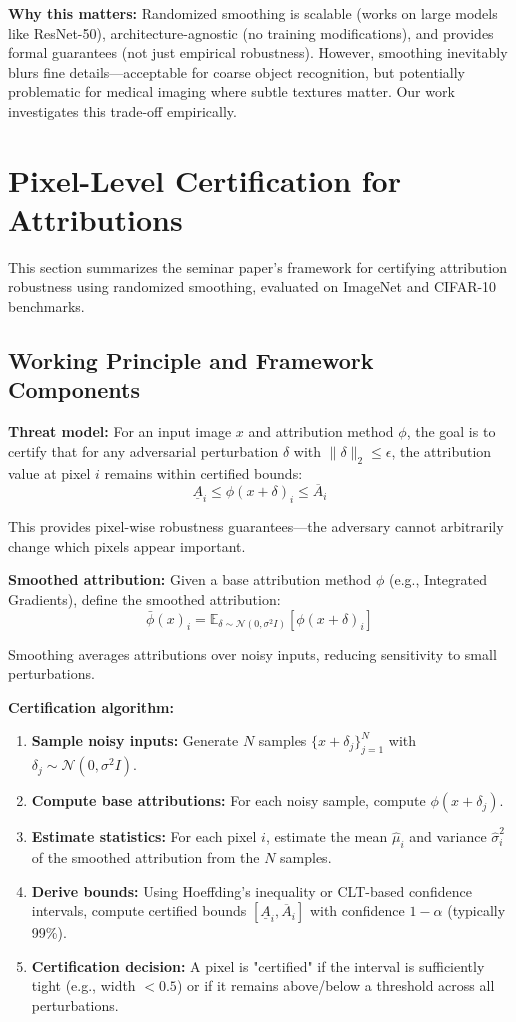 \documentclass[11pt]{article}
\begin{document}
\textbf{Why this matters:} Randomized smoothing is scalable (works on large models like ResNet-50), architecture-agnostic (no training modifications), and provides formal guarantees (not just empirical robustness). However, smoothing inevitably blurs fine details—acceptable for coarse object recognition, but potentially problematic for medical imaging where subtle textures matter. Our work investigates this trade-off empirically.



\section{Pixel-Level Certification for Attributions}

This section summarizes the seminar paper's framework for certifying attribution robustness using randomized smoothing, evaluated on ImageNet and CIFAR-10 benchmarks.

\subsection{Working Principle and Framework Components}

\textbf{Threat model:} For an input image $x$ and attribution method $\phi$, the goal is to certify that for any adversarial perturbation $\delta$ with $\|\delta\|_2 \leq \epsilon$, the attribution value at pixel $i$ remains within certified bounds:
$$\underline{A}_i \leq \phi(x + \delta)_i \leq \overline{A}_i$$

This provides pixel-wise robustness guarantees—the adversary cannot arbitrarily change which pixels appear important.

\textbf{Smoothed attribution:} Given a base attribution method $\phi$ (e.g., Integrated Gradients), define the smoothed attribution:
$$\bar{\phi}(x)_i = \mathbb{E}_{\delta \sim \mathcal{N}(0, \sigma^2 I)}[\phi(x + \delta)_i]$$

Smoothing averages attributions over noisy inputs, reducing sensitivity to small perturbations.

\textbf{Certification algorithm:}
\begin{enumerate}
    \item \textbf{Sample noisy inputs:} Generate $N$ samples $\{x + \delta_j\}_{j=1}^N$ with $\delta_j \sim \mathcal{N}(0, \sigma^2 I)$.
    \item \textbf{Compute base attributions:} For each noisy sample, compute $\phi(x + \delta_j)$.
    \item \textbf{Estimate statistics:} For each pixel $i$, estimate the mean $\hat{\mu}_i$ and variance $\hat{\sigma}_i^2$ of the smoothed attribution from the $N$ samples.
    \item \textbf{Derive bounds:} Using Hoeffding's inequality or CLT-based confidence intervals, compute certified bounds $[\underline{A}_i, \overline{A}_i]$ with confidence $1-\alpha$ (typically 99\%).
    \item \textbf{Certification decision:} A pixel is "certified" if the interval is sufficiently tight (e.g., width $< 0.5$) or if it remains above/below a threshold across all perturbations.
\end{enumerate}
\end{document}
